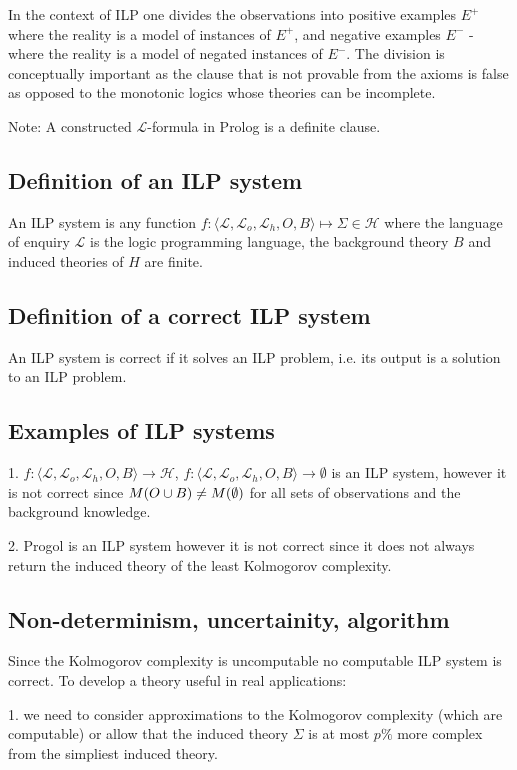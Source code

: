 In the context of ILP one divides the observations into positive examples $E^+$ where the reality is a model of instances of $E^+$, and negative examples $E^-$ - where the reality is a model of negated instances of $E^-$. The division is conceptually important as the clause that is not provable from the axioms is false as opposed to the monotonic logics whose theories can be incomplete.

Note: A constructed $\mathcal{L}$-formula in Prolog is a definite clause. 

\subsection{Definition of an ILP system}
An ILP system is any function $f:\langle\mathcal{L}, \mathcal{L}_o, \mathcal{L}_h, O, B\rangle \mapsto \Sigma \in \mathcal{H}$ where the language of enquiry $\mathcal{L}$ is the logic programming language, the background theory $B$ and induced theories of $H$ are finite.

\subsection{Definition of a correct ILP system}
An ILP system is correct if it solves an ILP problem, i.e. its output is a solution to an ILP problem.

\subsection{Examples of ILP systems}
1. $f:\langle\mathcal{L}, \mathcal{L}_o, \mathcal{L}_h, O, B\rangle \to \mathcal{H}$, $f:\langle\mathcal{L}, \mathcal{L}_o, \mathcal{L}_h, O, B\rangle \to \emptyset$ is an ILP system, however it is not correct since $M(O \cup B) \not= M(\emptyset)$ for all sets of observations and the background knowledge.

2. Progol is an ILP system however it is not correct since it does not always return the induced theory of the least Kolmogorov complexity.

\subsection{Non-determinism, uncertainity, algorithm}

Since the Kolmogorov complexity is uncomputable no computable ILP system is correct. To develop a theory useful in real applications:

1. we need to consider approximations to the Kolmogorov complexity (which are computable) or allow that the induced theory $\Sigma$ is at most $p\%$ more complex from the simpliest induced theory.

